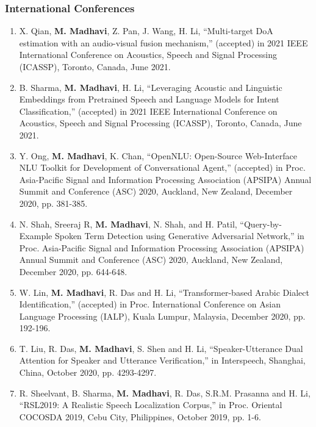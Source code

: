 \documentclass[10pt]{article}
\begin{document}
\subsubsection*{International Conferences}
\begin{enumerate}[resume]
				\setlength\itemsep{-0.05em}

\item X. Qian, \textbf{M. Madhavi}, Z. Pan, J. Wang, H. Li, ``Multi-target DoA estimation with an audio-visual fusion mechanism,'' (accepted) in 2021 IEEE International Conference on Acoustics, Speech and Signal Processing (ICASSP), Toronto, Canada, June 2021.

\item B. Sharma, \textbf{M. Madhavi}, H. Li, ``Leveraging Acoustic and Linguistic Embeddings from Pretrained Speech and Language Models for Intent Classification,'' (accepted) in 2021 IEEE International Conference on Acoustics, Speech and Signal Processing (ICASSP), Toronto, Canada, June 2021.

\item Y. Ong, \textbf{M. Madhavi}, K. Chan, ``OpenNLU: Open-Source Web-Interface NLU Toolkit for Development of Conversational Agent,'' (accepted) in Proc. Asia-Pacific Signal and Information Processing Association (APSIPA) Annual Summit and Conference (ASC) 2020, Auckland, New Zealand, December 2020, pp. 381-385.

\item N. Shah, Sreeraj R, \textbf{M. Madhavi}, N. Shah, and H. Patil, ``Query-by-Example Spoken Term Detection using Generative Adversarial Network,'' in Proc. Asia-Pacific Signal and Information Processing Association (APSIPA) Annual Summit and Conference (ASC) 2020, Auckland, New Zealand, December 2020, pp. 644-648.


\item W. Lin, \textbf{M. Madhavi}, R. Das and H. Li, ``Transformer-based Arabic Dialect Identification,'' (accepted) in Proc. International Conference on Asian Language Processing (IALP), Kuala Lumpur, Malaysia, December 2020, pp. 192-196.

\item T. Liu, R. Das, \textbf{M. Madhavi}, S. Shen and H. Li, ``Speaker-Utterance Dual Attention for Speaker and Utterance Verification,''  in Interspeech, Shanghai, China, October 2020, pp. 4293-4297.

\item R. Sheelvant, B. Sharma, \textbf{M. Madhavi}, R. Das, S.R.M. Prasanna and H. Li, ``RSL2019: A Realistic Speech Localization Corpus,'' in Proc. Oriental COCOSDA 2019, Cebu City, Philippines, October 2019, pp. 1-6.


\end{enumerate}
\end{document}

